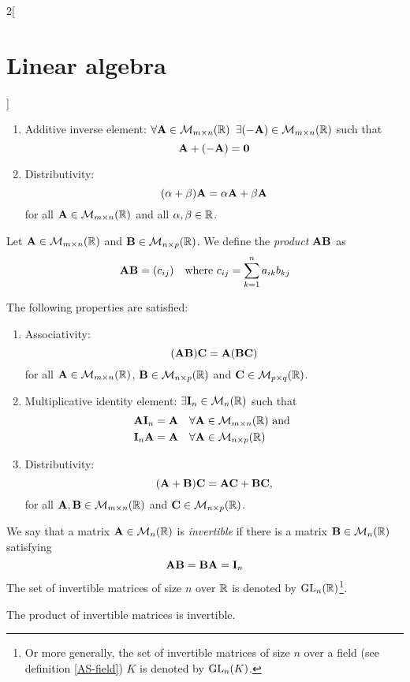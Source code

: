 \documentclass[../../../main.tex]{subfiles}
\begin{document}
\begin{multicols}{2}[\section{Linear algebra}]
\begin{prop}
\begin{enumerate}
        \item Additive inverse element: $\forall\vb{A}\in\mathcal{M}_{m\times n}(\mathbb{R})$ $\exists(-\vb{A})\in\mathcal{M}_{m\times n}(\mathbb{R})$ such that $$\vb{A}+(-\vb{A})=\vb{0}$$
        \item Distributivity: $$(\alpha+\beta)\vb{A}=\alpha\vb{A}+\beta\vb{A}$$ for all $\vb{A}\in\mathcal{M}_{m\times n}(\mathbb{R})$ and all $\alpha,\beta\in\mathbb{R}$.
    \end{enumerate}
\end{prop}
\begin{definition}
    Let $\vb{A}\in\mathcal{M}_{m\times n}(\mathbb{R})$ and $\vb{B}\in\mathcal{M}_{n\times p}(\mathbb{R})$. We define the \textit{product $\vb{A}\vb{B}$} as $$\vb{A}\vb{B}=(c_{ij})\quad\text{where }c_{ij}=\sum_{k=1}^na_{ik}b_{kj}$$
\end{definition}
\begin{prop}
    The following properties are satisfied:
    \begin{enumerate}
        \item Associativity: $$(\vb{A}\vb{B})\vb{C}=\vb{A}(\vb{B}\vb{C})$$ for all $\vb{A}\in\mathcal{M}_{m\times n}(\mathbb{R})$, $\vb{B}\in\mathcal{M}_{n\times p}(\mathbb{R})$ and $\vb{C}\in\mathcal{M}_{p\times q}(\mathbb{R})$.
        \item Multiplicative identity element: $\exists\vb{I}_n\in\mathcal{M}_n(\mathbb{R})$ such that 
        \begin{align*}
            &\vb{A}\vb{I}_n=\vb{A}\quad\forall\vb{A}\in\mathcal{M}_{m\times n}(\mathbb{R})\text{ and }\\
            &\vb{I}_n\vb{A}=\vb{A}\quad\forall\vb{A}\in\mathcal{M}_{n\times p}(\mathbb{R})
        \end{align*}
        \item Distributivity: $$(\vb{A}+\vb{B})\vb{C}=\vb{A}\vb{C}+\vb{B}\vb{C},$$ for all $\vb{A},\vb{B}\in\mathcal{M}_{m\times n}(\mathbb{R})$ and $\vb{C}\in\mathcal{M}_{n\times p}(\mathbb{R})$.
    \end{enumerate}
\end{prop}
\begin{definition}
    We say that a matrix $\vb{A}\in\mathcal{M}_n(\mathbb{R})$ is \textit{invertible} if there is a matrix $\vb{B}\in\mathcal{M}_n(\mathbb{R})$ satisfying $$\vb{A}\vb{B}=\vb{B}\vb{A}=\vb{I}_n$$
    The set of invertible matrices of size $n$ over $\mathbb{R}$ is denoted by $\mathrm{GL}_n(\mathbb{R})$\footnote{Or more generally, the set of invertible matrices of size $n$ over a field (see definition \ref{AS-field}) $K$ is denoted by $\mathrm{GL}_n(K)$.}.
\end{definition}
\begin{lemma}
    The product of invertible matrices is invertible.
\end{lemma}

\end{multicols}
\end{document}
